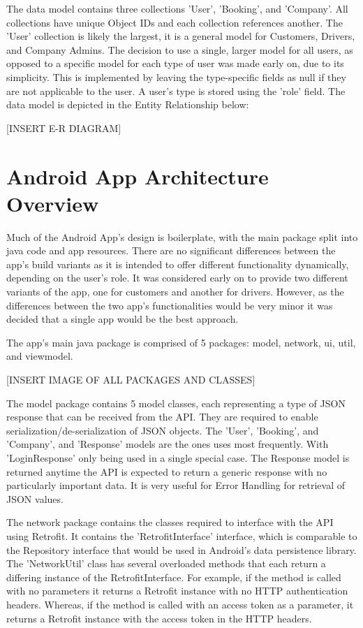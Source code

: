 The data model contains three collections 'User', 'Booking', and 'Company'. All collections have unique Object IDs and each collection references another. The 'User' collection is likely the largest, it is a general model for Customers, Drivers, and Company Admins. The decision to use a single, larger model for all users, as opposed to a specific model for each type of user was made early on, due to its simplicity. This is implemented by leaving the type-specific fields as null if they are not applicable to the user. A user's type is stored using the 'role' field. The data model is depicted in the Entity Relationship below:

[INSERT E-R DIAGRAM]

\section{Android App Architecture Overview}
Much of the Android App's design is boilerplate, with the main package split into java code and app resources. There are no significant differences between the app's build variants as it is intended to offer different functionality dynamically, depending on the user's role. It was considered early on to provide two different variants of the app, one for customers and another for drivers. However, as the differences between the two app's functionalities would be very minor it was decided that a single app would be the best approach.

The app's main java package is comprised of 5 packages: model, network, ui, util, and viewmodel.

[INSERT IMAGE OF ALL PACKAGES AND CLASSES]

The model package contains 5 model classes, each representing a type of JSON response that can be received from the API. They are required to enable serialization/de-serialization of JSON objects. The 'User', 'Booking', and 'Company', and 'Response' models are the ones uses most frequently. With 'LoginResponse' only being used in a single special case. The Response model is returned anytime the API is expected to return a generic response with no particularly important data. It is very useful for Error Handling for retrieval of JSON values.

The network package contains the classes required to interface with the API using Retrofit. It contains the 'RetrofitInterface' interface, which is comparable to the Repository interface that would be used in Android's data persistence library. The 'NetworkUtil' class has several overloaded methods that each return a differing instance of the RetrofitInterface. For example, if the method is called with no parameters it returns a Retrofit instance with no HTTP authentication headers. Whereas, if the method is called with an access token as a parameter, it returns a Retrofit instance with the access token in the HTTP headers.

